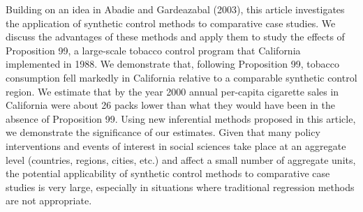  Building on an idea in Abadie and Gardeazabal (2003), this article investigates the application of synthetic control methods to comparative case studies. We discuss the advantages of these methods and apply them to study the effects of Proposition 99, a large-scale tobacco control program that California implemented in 1988. We demonstrate that, following Proposition 99, tobacco consumption fell markedly in California relative to a comparable synthetic control region. We estimate that by the year 2000 annual per-capita cigarette sales in California were about 26 packs lower than what they would have been in the absence of Proposition 99. Using new inferential methods proposed in this article, we demonstrate the significance of our estimates. Given that many policy interventions and events of interest in social sciences take place at an aggregate level (countries, regions, cities, etc.) and affect a small number of aggregate units, the potential applicability of synthetic control methods to comparative case studies is very large, especially in situations where traditional regression methods are not appropriate. 